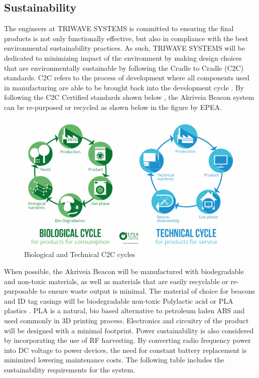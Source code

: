 \break
\subsection{Sustainability}
\bigskip
The engineers at TRIWAVE SYSTEMS is committed to ensuring the final products is not only functionally effective, but also in compliance with the best environmental sustainability practices. As such, TRIWAVE SYSTEMS will be dedicated to minimizing impact of the environment by making design choices that are environmentally sustainable by following the Cradle to Cradle (\Gls{C2C}) standards. C2C refers to the process of development where all components used in manufacturing are able to be brought back into the development cycle \cite{R23}. By following the C2C Certified standards shown below \cite{R25}, the Akriveia Beacon system can be re-purposed or recycled as shown below in the figure by EPEA.

\begin{figure}[H]
\centering
    \includegraphics[scale=0.85]{./images/BioTechCycle.png}
    \caption{Biological and Technical C2C cycles}
\end{figure}

When possible, the Akriveia Beacon will be manufactured with biodegradable and non-toxic materials, as well as materials that are easily recyclable or re-purposable to ensure waste output is minimal. The material of choice for beacons and ID tag casings will be biodegradable non-toxic Polylactic acid or PLA plastics \cite{R25}. PLA is a natural, bio based alternative to petroleum laden ABS and used commonly in 3D printing process. Electronics and circuitry of the product will be designed with a minimal footprint. Power sustainability is also considered by incorporating the use of RF harvesting. By converting radio frequency power into DC voltage to power devices, the need for constant battery replacement is minimized lowering maintenance costs. The following table includes the sustainability requirements for the system.


